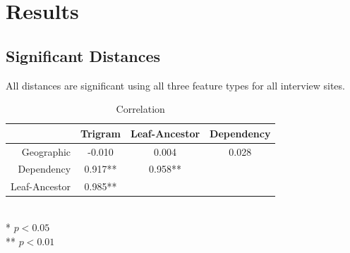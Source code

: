 \chapter{Results}

\section{Significant Distances}
All distances are significant using all three feature types for all
interview sites.

\begin{table}
\begin{tabular}{r|ccc}
  & Trigram & Leaf-Ancestor & Dependency  \\ \hline
  Geographic & -0.010 & 0.004 & 0.028 \\
  Dependency & 0.917** & 0.958** & \\
  Leaf-Ancestor & 0.985** & & \\
\end{tabular} \\
* $ p < 0.05$ \\
** $ p < 0.01$ \\
\label{correlation}
\caption{Correlation}
\end{table}

